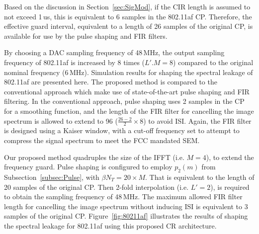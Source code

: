 Based on the discussion in Section~\ref{sec:SigMod}, if the CIR length is assumed to not exceed 1\,us, this is equivalent to 6 samples in the 802.11af CP.
Therefore, the effective guard interval, equivalent to a length of 26 samples of the original CP, is available for use by the pulse shaping and FIR filters.

By choosing a DAC sampling frequency of 48\,MHz, the output sampling frequency of 802.11af is increased by 8 times ($L'.M =8$) compared to the original nominal frequency (6\,MHz).
Simulation results for shaping the spectral leakage of 802.11af are presented here.
The proposed method is compared to the conventional approach which make use of state-of-the-art pulse shaping and FIR filtering.
In the conventional approach, pulse shaping uses 2 samples in the CP for a smoothing function, and the length of the FIR filter for cancelling the image spectrum is allowed to extend to 96 ($\frac{26-2}{2} \times 8$) to avoid ISI.
Again, the FIR filter is designed using a Kaiser window, with a cut-off frequency set to attempt to compress the signal spectrum to meet the FCC mandated SEM.

Our proposed method quadruples the size of the IFFT (i.e. $M=4$), to extend the frequency guard.
Pulse shaping is configured to employ $p_2(m)$ from Subsection~\ref{subsec:Pulse}, with $\beta N_{T}=20 \times M$. That is equivalent to the length of 20 samples of the original CP.
Then 2-fold interpolation (i.e. $L'=2$), is required to obtain the sampling frequency of 48\,MHz.
The maximum allowed FIR filter length for cancelling the image spectrum without inducing ISI is equivalent to 3 samples of the original CP.
Figure~\ref{fig:80211af} illustrates the results of shaping the spectral leakage for 802.11af using this proposed CR architecture.

